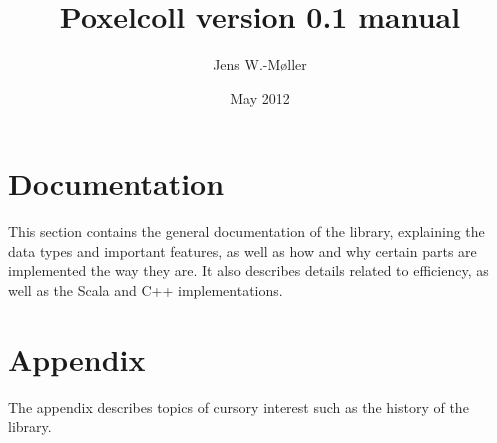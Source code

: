 \documentclass{article}
\begin{document}
\title{Poxelcoll version 0.1 manual}
\date{May 2012}
\author{Jens W.-Møller}
\maketitle

\tableofcontents

\listoffigures





\section{Documentation}

This section contains the general documentation of the library,
explaining the data types and important features,
as well as how and why certain parts are implemented the way
they are. It also describes details related to efficiency,
as well as the Scala and C++ implementations.













\section{Appendix}

The appendix describes topics of cursory interest such as
the history of the library.


\end{document}
